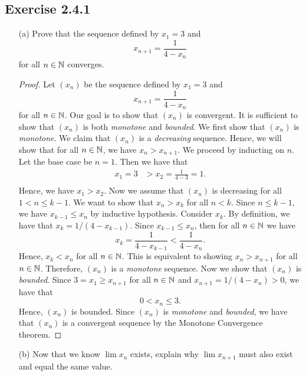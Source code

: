 \subsection{Exercise 2.4.1}
\begin{enumerate}
    \item[(a)] Prove that the sequence defined by \( x_1 = 3\) and 
        \[ x_{n+1} = \frac{1}{4 - x_n}\]
        for all \( n \in \mathbb{N} \) converges.
        \begin{proof}
            Let \( (x_n)\) be the sequence defined by \( x_1 = 3\) and 
            \[ x_{n+1} = \frac{1}{4-x_n}\]
            for all \( n \in \mathbb{N}\). Our goal is to show that \( (x_n)\) is convergent. It is sufficient to show that \( (x_n)\) is both \textit{monotone} and \textit{bounded}. We first show that \( (x_n)\) is \textit{monotone}. We claim that \( (x_n)\) is a \textit{decreasing} sequence. Hence, we will show that for all \( n \in \mathbb{N} \), we have \( x_n > x_{n+1}\). We proceed by inducting on \( n \). Let the base case be \( n = 1 \). Then we have that 
            \begin{align*}
                x_1 = 3 &> x_2 = \frac{1}{4 - 3} = 1. \\ 
            \end{align*}
            Hence, we have \( x_1 > x_2 \). Now we assume that \( (x_n)\) is decreasing for all \( 1 < n \leq k-1 \). We want to show that \( x_n > x_k \) for all \( n < k \). Since \( n \leq k - 1\), we have \( x_{k-1} \leq x_n \) by inductive hypothesis. Consider \( x_k \). By definition, we have that \( x_k = 1 /(4 - x_{k-1})\). Since \( x_{k-1} \leq x_n \), then for all \( n \in \mathbb{N} \) we have 
            \[
                x_k = \frac{1}{4 - x_{k-1}} < \frac{1}{4-x_n}.
            \]
            Hence, \( x_k < x_n \) for all \( n \in \mathbb{N} \). This is equivalent to showing \( x_n > x_{n+1}\) for all \( n \in \mathbb{N} \). Therefore, \( (x_n)\) is a \textit{monotone} sequence. 
            Now we show that \( (x_n)\) is \textit{bounded}. Since \( 3 = x_1 \geq x_{n+1}\) for all \( n \in \mathbb{N} \) and \( x_{n+1} = 1 / (4 - x_n) > 0 \), we have that 
            \[ 0 < x_n \leq 3.\]
            Hence, \( (x_n)\) is bounded. Since \( (x_n)\) is \textit{monotone} and \textit{bounded}, we have that 
            \( (x_n)\) is a convergent sequence by the Monotone Convergence theorem. 
        \end{proof}
    \item[(b)] Now that we know \( \lim x_n \) exists, explain why \( \lim x_{n+1}\) must also exist and equal the same value.

\end{enumerate}
